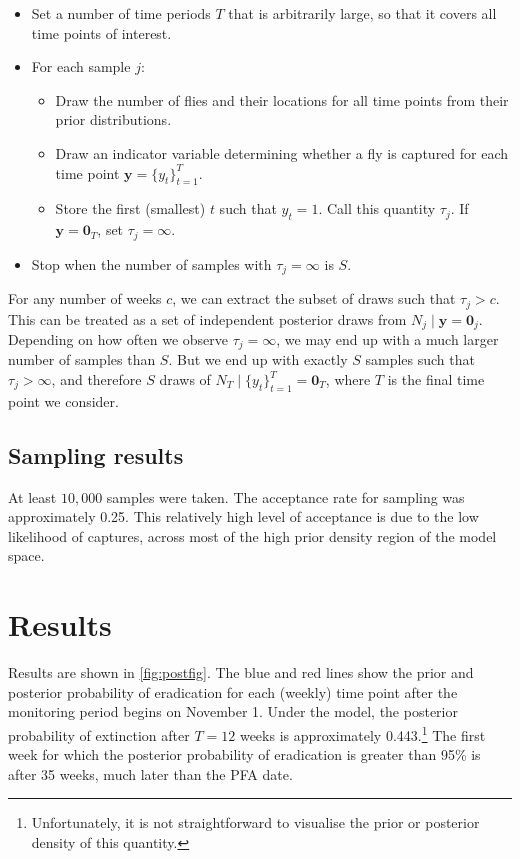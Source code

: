 \documentclass[
  oneside]{book}
\providecommand{\tightlist}{%
  \setlength{\itemsep}{0pt}\setlength{\parskip}{0pt}}
\begin{document}
\begin{itemize}
\tightlist
\item
  Set a number of time periods \(T\) that is arbitrarily large, so that it covers all time points of interest.
\item
  For each sample \(j\):

  \begin{itemize}
  \tightlist
  \item
    Draw the number of flies and their locations for all time points from their prior distributions.
  \item
    Draw an indicator variable determining whether a fly is captured for each time point \(\mathbf y = \{y_t\}_{t=1}^T\).
  \item
    Store the first (smallest) \(t\) such that \(y_t = 1\). Call this quantity \(\tau_j\). If \(\mathbf y = \mathbf 0_T\), set \(\tau_j = \infty\).
  \end{itemize}
\item
  Stop when the number of samples with \(\tau_j = \infty\) is \(S\).
\end{itemize}

For any number of weeks \(c\), we can extract the subset of draws such that \(\tau_j > c\). This can be treated as a set of independent posterior draws from \(N_j \mid \mathbf y = \mathbf 0_j\). Depending on how often we observe \(\tau_j = \infty\), we may end up with a much larger number of samples than \(S\). But we end up with exactly \(S\) samples such that \(\tau_j > \infty\), and therefore \(S\) draws of \(N_T \mid \{y_t\}_{t=1}^T = \mathbf 0_T\), where \(T\) is the final time point we consider.

\hypertarget{sampling-results}{%
\subsection{Sampling results}\label{sampling-results}}

At least \(10{,}000\) samples were taken. The acceptance rate for sampling was approximately 0.25. This relatively high level of acceptance is due to the low likelihood of captures, across most of the high prior density region of the model space.

\hypertarget{results}{%
\section{Results}\label{results}}

Results are shown in \ref{fig:postfig}. The blue and red lines show the prior and posterior probability of eradication for each (weekly) time point after the monitoring period begins on November 1. Under the model, the posterior probability of extinction after \(T=12\) weeks is approximately 0.443.\footnote{Unfortunately, it is not straightforward to visualise the prior or posterior density of this quantity.} The first week for which the posterior probability of eradication is greater than 95\% is after 35 weeks, much later than the PFA date.
\end{document}
